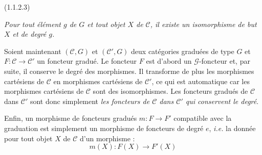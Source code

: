 \noindent\textnormal{(1.1.2.3)}\quad
\begin{minipage}[t]{0.78\textwidth}
\emph{Pour tout élément $g$ de $G$ et tout objet $X$ de $\mathcal C$, il
existe un isomorphisme de but $X$ et de degré $g$.}
\end{minipage}
\par\medskip

Soient maintenant $(\mathcal C,G)$ et $(\mathcal C',G)$ deux catégories
graduées de type $G$ et $F\colon\mathcal C\to\mathcal C'$ un foncteur
gradué. Le foncteur $F$ est d'abord un $\mathcal G$-foncteur et, par suite,
il conserve le degré des morphismes. Il transforme de plus les morphismes
cartésiens de $\mathcal C$ en morphismes cartésiens de $\mathcal C'$, ce
qui est automatique car les morphismes cartésiens de $\mathcal C$ sont des
isomorphismes. Les foncteurs gradués de $\mathcal C$ dans $\mathcal C'$
sont donc simplement \emph{les foncteurs de $\mathcal C$ dans
$\mathcal C'$ qui conservent le degré}.

Enfin, un morphisme de foncteurs gradués $m\colon F\to F'$ compatible avec
la graduation est simplement un morphisme de foncteurs de degré $e$,
\emph{i.e.} la donnée pour tout objet $X$ de $\mathcal C$ d'un morphisme :
\[
  m(X)\colon F(X)\longrightarrow F'(X)
\]
